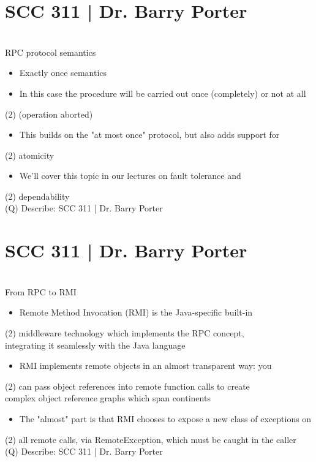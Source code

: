 \documentclass[12pt]{article}
\begin{document}
\section{SCC 311 | Dr. Barry Porter}
\\
RPC protocol semantics\\
\begin{itemize}
  \item Exactly once semantics
  \item In this case the procedure will be carried out once (completely) or not at all 
\end{itemize}(2)
(operation aborted)\\
\begin{itemize}
  \item This builds on the "at most once" protocol, but also adds support for 
\end{itemize}(2)
atomicity\\
\begin{itemize}
  \item We'll cover this topic in our lectures on fault tolerance and 
\end{itemize}(2)
dependability\\
\clearpage
(Q)
Describe: SCC 311 | Dr. Barry Porter
\clearpage
\section{SCC 311 | Dr. Barry Porter}
\\
From RPC to RMI\\
\begin{itemize}
  \item Remote Method Invocation (RMI) is the Java-specific built-in 
\end{itemize}(2)
middleware technology which implements the RPC concept, \\
integrating it seamlessly with the Java language\\
\begin{itemize}
  \item RMI implements remote objects in an almost transparent way: you 
\end{itemize}(2)
can pass object references into remote function calls to create \\
complex object reference graphs which span continents\\
\begin{itemize}
  \item The "almost" part is that RMI chooses to expose a new class of exceptions on 
\end{itemize}(2)
all remote calls, via RemoteException, which must be caught in the caller\\
\clearpage
(Q)
Describe: SCC 311 | Dr. Barry Porter
\clearpage
\end{document}
